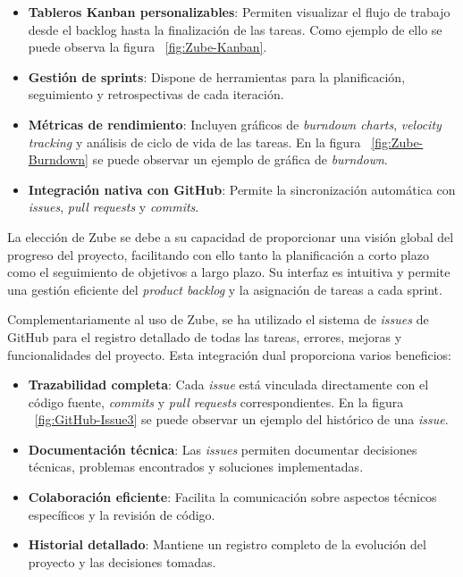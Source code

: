 \begin{itemize}
\tightlist
\item
\textbf{Tableros Kanban personalizables}: Permiten visualizar el flujo de trabajo desde el backlog hasta la finalización de las tareas. Como ejemplo de ello se puede observa la figura ~\ref{fig:Zube-Kanban}.


\item
\textbf{Gestión de sprints}: Dispone de herramientas para la planificación, seguimiento y retrospectivas de cada iteración.
\item
\textbf{Métricas de rendimiento}: Incluyen gráficos de \emph{burndown charts}, \emph{velocity tracking} y análisis de ciclo de vida de las tareas. En la figura ~\ref{fig:Zube-Burndown} se puede observar un ejemplo de gráfica de \emph{burndown}.


\item
\textbf{Integración nativa con GitHub}: Permite la sincronización automática con \emph{issues}, \emph{pull requests} y \emph{commits}.
\end{itemize}

La elección de Zube se debe a su capacidad de proporcionar una visión global del progreso del proyecto, facilitando con ello tanto la planificación a corto plazo como el seguimiento de objetivos a largo plazo. Su interfaz es intuitiva y permite una gestión eficiente del \emph{product backlog} y la asignación de tareas a cada sprint.

Complementariamente al uso de Zube, se ha utilizado el sistema de \emph{issues} de GitHub para el registro detallado de todas las tareas, errores, mejoras y funcionalidades del proyecto. Esta integración dual proporciona varios beneficios:

\begin{itemize}
\tightlist
\item
\textbf{Trazabilidad completa}: Cada \emph{issue} está vinculada directamente con el código fuente, \emph{commits} y \emph{pull requests} correspondientes. En la figura ~\ref{fig:GitHub-Issue3} se puede observar un ejemplo del histórico de una \emph{issue}.
\item
\textbf{Documentación técnica}: Las \emph{issues} permiten documentar decisiones técnicas, problemas encontrados y soluciones implementadas.
\item
\textbf{Colaboración eficiente}: Facilita la comunicación sobre aspectos técnicos específicos y la revisión de código.
\item
\textbf{Historial detallado}: Mantiene un registro completo de la evolución del proyecto y las decisiones tomadas.
\end{itemize}

